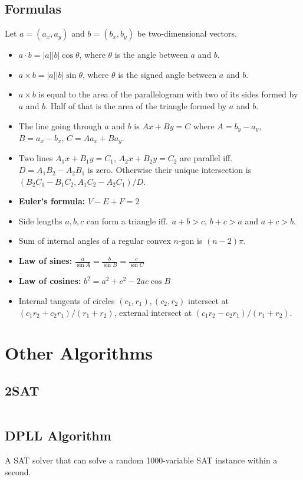 \documentclass[8pt,a4paper,landscape,oneside]{amsart}
\newcommand{\code}[1]{\inputminted[fontsize=\normalsize,baselinestretch=1]{cpp}{_code/#1}}
\newif\ifverbose
\begin{document}
\begin{multicols*}{3}
  \subsection{Formulas}
    Let $a = (a_x, a_y)$ and $b = (b_x, b_y)$ be two-dimensional vectors.
    \begin{itemize}
      \item $a\cdot b = |a||b|\cos{\theta}$, where $\theta$ is the angle
        between $a$ and $b$.
      \item $a\times b = |a||b|\sin{\theta}$, where $\theta$ is the
        signed angle between $a$ and $b$.
      \item $a\times b$ is equal to the area of the parallelogram with
        two of its sides formed by $a$ and $b$. Half of that is the
        area of the triangle formed by $a$ and $b$.
      \item The line going through $a$ and $b$ is $Ax+By=C$ where $A=b_y-a_y$, $B=a_x-b_x$, $C=Aa_x+Ba_y$.
      \item Two lines $A_1x+B_1y=C_1$, $A_2x+B_2y=C_2$ are parallel iff.\ $D=A_1B_2-A_2B_1$ is zero. Otherwise their unique intersection is $(B_2C_1-B_1C_2,A_1C_2-A_2C_1)/D$.
      \item \textbf{Euler's formula:} $V - E + F = 2$
      \item Side lengths $a,b,c$ can form a triangle iff.\ $a+b>c$, $b+c>a$ and $a+c>b$.
      \item Sum of internal angles of a regular convex $n$-gon is $(n-2)\pi$.
      \item \textbf{Law of sines:} $\frac{a}{\sin A} = \frac{b}{\sin B} = \frac{c}{\sin C}$
      \item \textbf{Law of cosines:} $b^2 = a^2 + c^2 - 2ac\cos B$
      \item Internal tangents of circles $(c_1,r_1), (c_2,r_2)$ intersect at $(c_1r_2+c_2r_1)/(r_1+r_2)$, external intersect at $(c_1r_2-c_2r_1)/(r_1+r_2)$.
    \end{itemize}
\section{Other Algorithms}
  \subsection{2SAT}
    \ifverbose
    A fast 2SAT solver.
    \fi
    \code{other/two_sat.cpp}
  \subsection{DPLL Algorithm}
    A SAT solver that can solve a random 1000-variable SAT instance within a second.
    \code{other/dpll.cpp}

\end{multicols*}
\end{document}
